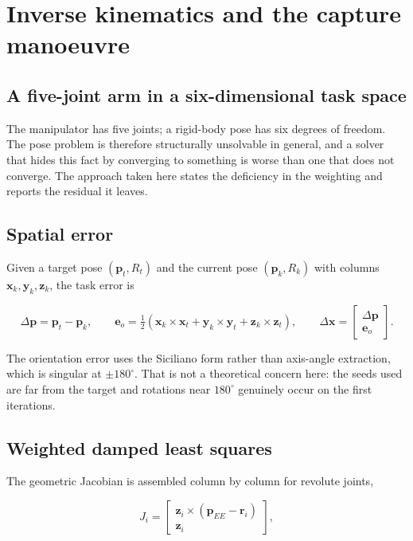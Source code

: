\section{Inverse kinematics and the capture manoeuvre}
\label{sec:ik}

\subsection{A five-joint arm in a six-dimensional task space}

The manipulator has five joints; a rigid-body pose has six degrees of freedom.
The pose problem is therefore structurally unsolvable in general, and a solver
that hides this fact by converging to something is worse than one that does not
converge. The approach taken here states the deficiency in the weighting and
reports the residual it leaves.

\subsection{Spatial error}

Given a target pose $(\mathbf p_t, R_t)$ and the current pose
$(\mathbf p_k, R_k)$ with columns $\mathbf x_k, \mathbf y_k, \mathbf z_k$, the
task error is

\begin{equation}
\Delta\mathbf p = \mathbf p_t - \mathbf p_k, \qquad
\mathbf e_o = \tfrac12\left(\mathbf x_k\times\mathbf x_t + \mathbf y_k\times\mathbf y_t + \mathbf z_k\times\mathbf z_t\right),
\qquad
\Delta\mathbf x = \begin{bmatrix}\Delta\mathbf p \\ \mathbf e_o\end{bmatrix}.
\label{eq:taskerr}
\end{equation}

The orientation error uses the Siciliano form \cite{siciliano} rather than
axis-angle extraction, which is singular at $\pm180^\circ$. That is not a
theoretical concern here: the seeds used are far from the target and rotations
near $180^\circ$ genuinely occur on the first iterations.

\subsection{Weighted damped least squares}

The geometric Jacobian is assembled column by column for revolute joints,

\begin{equation}
J_i = \begin{bmatrix} \mathbf z_{i}\times(\mathbf p_{EE} - \mathbf r_{i}) \\ \mathbf z_{i}\end{bmatrix},
\label{eq:jacobian}
\end{equation}

